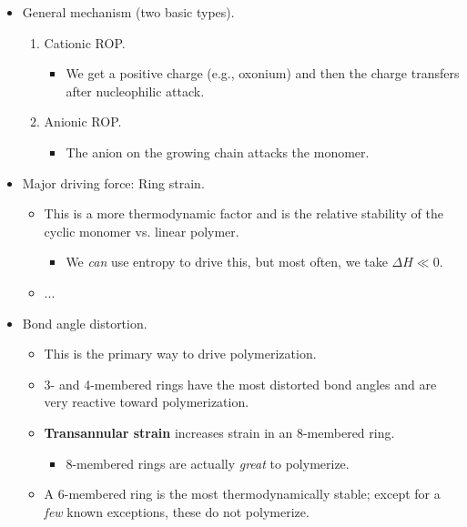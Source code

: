 \documentclass[../notes.tex]{subfiles}
\begin{document}
\begin{itemize}
\begin{itemize}
    \end{itemize}
    \item General mechanism (two basic types).
    \begin{enumerate}
        \item Cationic ROP.
        \begin{itemize}
            \item We get a positive charge (e.g., oxonium) and then the charge transfers after nucleophilic attack.
        \end{itemize}
        \item Anionic ROP.
        \begin{itemize}
            \item The anion on the growing chain attacks the monomer.
        \end{itemize}
    \end{enumerate}
    \item Major driving force: Ring strain.
    \begin{itemize}
        \item This is a more thermodynamic factor and is the relative stability of the cyclic monomer vs. linear polymer.
        \begin{itemize}
            \item We \emph{can} use entropy to drive this, but most often, we take $\Delta H\ll 0$.
        \end{itemize}
        \item ...
    \end{itemize}
    \item Bond angle distortion.
    \begin{itemize}
        \item This is the primary way to drive polymerization.
        \item 3- and 4-membered rings have the most distorted bond angles and are very reactive toward polymerization.
        \item \textbf{Transannular strain} increases strain in an 8-membered ring.
        \begin{itemize}
            \item 8-membered rings are actually \emph{great} to polymerize.
        \end{itemize}
        \item A 6-membered ring is the most thermodynamically stable; except for a \emph{few} known exceptions, these do not polymerize.
        \begin{itemize}

\end{itemize}
\end{itemize}
\end{itemize}
\end{document}
